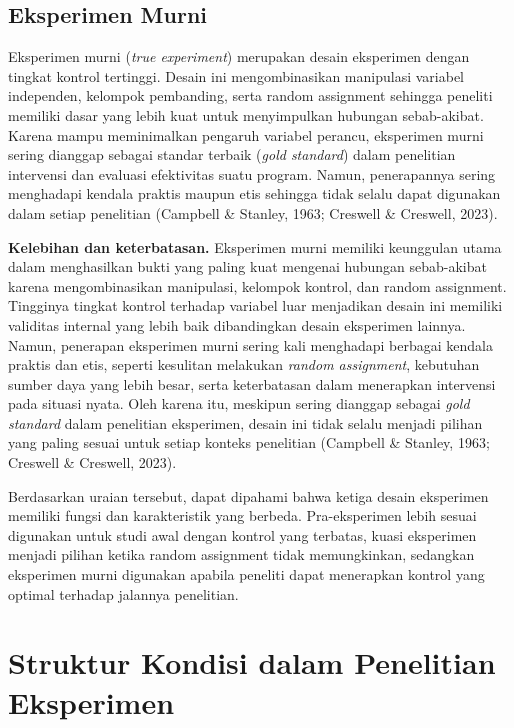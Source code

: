 \documentclass[
  indonesian,
  letterpaper,
  DIV=11,
  numbers=noendperiod]{scrreprt}
\begin{document}
\subsection{Eksperimen Murni}\label{eksperimen-murni}

Eksperimen murni (\emph{true experiment}) merupakan desain eksperimen
dengan tingkat kontrol tertinggi. Desain ini mengombinasikan manipulasi
variabel independen, kelompok pembanding, serta random assignment
sehingga peneliti memiliki dasar yang lebih kuat untuk menyimpulkan
hubungan sebab-akibat. Karena mampu meminimalkan pengaruh variabel
perancu, eksperimen murni sering dianggap sebagai standar terbaik
(\emph{gold standard}) dalam penelitian intervensi dan evaluasi
efektivitas suatu program. Namun, penerapannya sering menghadapi kendala
praktis maupun etis sehingga tidak selalu dapat digunakan dalam setiap
penelitian (Campbell \& Stanley, 1963; Creswell \& Creswell, 2023).

\textbf{Kelebihan dan keterbatasan.} Eksperimen murni memiliki
keunggulan utama dalam menghasilkan bukti yang paling kuat mengenai
hubungan sebab-akibat karena mengombinasikan manipulasi, kelompok
kontrol, dan random assignment. Tingginya tingkat kontrol terhadap
variabel luar menjadikan desain ini memiliki validitas internal yang
lebih baik dibandingkan desain eksperimen lainnya. Namun, penerapan
eksperimen murni sering kali menghadapi berbagai kendala praktis dan
etis, seperti kesulitan melakukan \emph{random assignment}, kebutuhan
sumber daya yang lebih besar, serta keterbatasan dalam menerapkan
intervensi pada situasi nyata. Oleh karena itu, meskipun sering dianggap
sebagai \emph{gold standard} dalam penelitian eksperimen, desain ini
tidak selalu menjadi pilihan yang paling sesuai untuk setiap konteks
penelitian (Campbell \& Stanley, 1963; Creswell \& Creswell, 2023).

Berdasarkan uraian tersebut, dapat dipahami bahwa ketiga desain
eksperimen memiliki fungsi dan karakteristik yang berbeda.
Pra-eksperimen lebih sesuai digunakan untuk studi awal dengan kontrol
yang terbatas, kuasi eksperimen menjadi pilihan ketika random assignment
tidak memungkinkan, sedangkan eksperimen murni digunakan apabila
peneliti dapat menerapkan kontrol yang optimal terhadap jalannya
penelitian.

\section{Struktur Kondisi dalam Penelitian
Eksperimen}\label{struktur-kondisi-dalam-penelitian-eksperimen}
\end{document}
